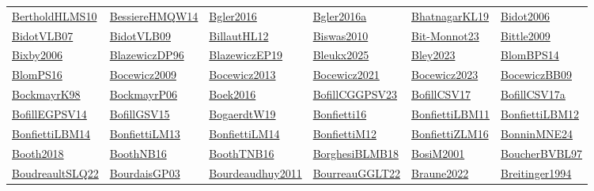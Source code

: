 \begin{longtable}{*{6}{l}}
\hyperref[detail:BertholdHLMS10]{BertholdHLMS10} & \hyperref[detail:BessiereHMQW14]{BessiereHMQW14} & \hyperref[detail:Bgler2016]{Bgler2016} & \hyperref[detail:Bgler2016a]{Bgler2016a} & \hyperref[detail:BhatnagarKL19]{BhatnagarKL19} & \hyperref[detail:Bidot2006]{Bidot2006}\\ 
\hyperref[detail:BidotVLB07]{BidotVLB07} & \hyperref[detail:BidotVLB09]{BidotVLB09} & \hyperref[detail:BillautHL12]{BillautHL12} & \hyperref[detail:Biswas2010]{Biswas2010} & \hyperref[detail:Bit-Monnot23]{Bit-Monnot23} & \hyperref[detail:Bittle2009]{Bittle2009}\\ 
\hyperref[detail:Bixby2006]{Bixby2006} & \hyperref[detail:BlazewiczDP96]{BlazewiczDP96} & \hyperref[detail:BlazewiczEP19]{BlazewiczEP19} & \hyperref[detail:Bleukx2025]{Bleukx2025} & \hyperref[detail:Bley2023]{Bley2023} & \hyperref[detail:BlomBPS14]{BlomBPS14}\\ 
\hyperref[detail:BlomPS16]{BlomPS16} & \hyperref[detail:Bocewicz2009]{Bocewicz2009} & \hyperref[detail:Bocewicz2013]{Bocewicz2013} & \hyperref[detail:Bocewicz2021]{Bocewicz2021} & \hyperref[detail:Bocewicz2023]{Bocewicz2023} & \hyperref[detail:BocewiczBB09]{BocewiczBB09}\\ 
\hyperref[detail:BockmayrK98]{BockmayrK98} & \hyperref[detail:BockmayrP06]{BockmayrP06} & \hyperref[detail:Boek2016]{Boek2016} & \hyperref[detail:BofillCGGPSV23]{BofillCGGPSV23} & \hyperref[detail:BofillCSV17]{BofillCSV17} & \hyperref[detail:BofillCSV17a]{BofillCSV17a}\\ 
\hyperref[detail:BofillEGPSV14]{BofillEGPSV14} & \hyperref[detail:BofillGSV15]{BofillGSV15} & \hyperref[detail:BogaerdtW19]{BogaerdtW19} & \hyperref[detail:Bonfietti16]{Bonfietti16} & \hyperref[detail:BonfiettiLBM11]{BonfiettiLBM11} & \hyperref[detail:BonfiettiLBM12]{BonfiettiLBM12}\\ 
\hyperref[detail:BonfiettiLBM14]{BonfiettiLBM14} & \hyperref[detail:BonfiettiLM13]{BonfiettiLM13} & \hyperref[detail:BonfiettiLM14]{BonfiettiLM14} & \hyperref[detail:BonfiettiM12]{BonfiettiM12} & \hyperref[detail:BonfiettiZLM16]{BonfiettiZLM16} & \hyperref[detail:BonninMNE24]{BonninMNE24}\\ 
\hyperref[detail:Booth2018]{Booth2018} & \hyperref[detail:BoothNB16]{BoothNB16} & \hyperref[detail:BoothTNB16]{BoothTNB16} & \hyperref[detail:BorghesiBLMB18]{BorghesiBLMB18} & \hyperref[detail:BosiM2001]{BosiM2001} & \hyperref[detail:BoucherBVBL97]{BoucherBVBL97}\\ 
\hyperref[detail:BoudreaultSLQ22]{BoudreaultSLQ22} & \hyperref[detail:BourdaisGP03]{BourdaisGP03} & \hyperref[detail:Bourdeaudhuy2011]{Bourdeaudhuy2011} & \hyperref[detail:BourreauGGLT22]{BourreauGGLT22} & \hyperref[detail:Braune2022]{Braune2022} & \hyperref[detail:Breitinger1994]{Breitinger1994}\\ 

\end{longtable}
